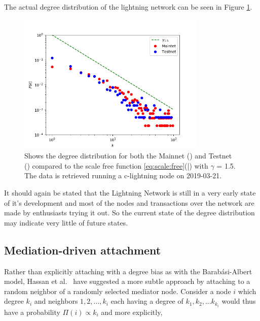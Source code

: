 
The actual degree distribution of the lightning network can be seen in Figure \ref{fig:real_network}.

\begin{figure}[!htb]
	\hspace*{-0.5cm} 
	\centering
	\includegraphics[width=9cm]{images/main-testnet_degree_distribution.png}
	\caption{Shows the degree distribution for both the Mainnet (\tikzcircle[red, fill=red]{2pt}) and Testnet (\tikzcircle[blue, fill=blue]{2pt})
		compared to the scale free function \ref{eq:scale:free}(\textcolor{black}{|}) with $\gamma$ = 1.5. The data is retrieved running a c-lightning node\cite{repository:clightning} on 2019-03-21.
	}
	\label{fig:real_network}
	\hspace*{2mm} 
\end{figure}

It should again be stated that the Lightning Network is still in a very early state of it's development and most of the nodes and transactions over the network are made by enthusiasts trying it out. So the current state of the degree distribution may indicate very little of future states. 

\subsection{Mediation-driven attachment}

Rather than explicitly attaching with a degree bias as with the Barabási-Albert model, Hassan et al.~\cite{hassan:islam:haque:mediation} have suggested a more subtle approach by attaching to a random neighbor of a randomly selected mediator node. Consider a node $i$ which degree $k_i$ and neighbors $1,2,...,k_i$ each having a degree of $k_1, k_2, ... k_{k_i}$ would thus have a probability $\Pi(i) \propto k_i$ and more explicitly,


